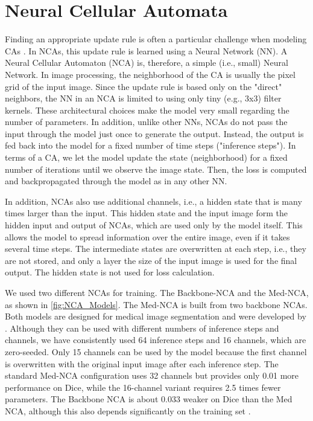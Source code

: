 \section{Neural Cellular Automata}
\label{methods:NCA}
Finding an appropriate update rule is often a particular challenge when modeling CAs \cite{Gilpin:2019:IntroduceNCA}. In NCAs, this update rule is learned using a Neural Network (NN). A Neural Cellular Automaton (NCA) is, therefore, a simple (i.e., small) Neural Network. In image processing, the neighborhood of the CA is usually the pixel grid of the input image. Since the update rule is based only on the "direct" neighbors, the NN in an NCA is limited to using only tiny (e.g., 3x3) filter kernels. These architectural choices make the model very small regarding the number of parameters. In addition, unlike other NNs, NCAs do not pass the input through the model just once to generate the output. Instead, the output is fed back into the model for a fixed number of time steps ("inference steps"). In terms of a CA, we let the model update the state (neighborhood) for a fixed number of iterations until we observe the image state. Then, the loss is computed and backpropagated through the model as in any other NN. 

In addition, NCAs also use additional channels, i.e., a hidden state that is many times larger than the input. This hidden state and the input image form the hidden input and output of NCAs, which are used only by the model itself. This allows the model to spread information over the entire image, even if it takes several time steps. The intermediate states are overwritten at each step, i.e., they are not stored, and only a layer the size of the input image is used for the final output. The hidden state is not used for loss calculation.


\label{methods:NCA:Models}
We used two different NCAs for training. The Backbone-NCA and the Med-NCA, as shown in \autoref{fig:NCA_Models}. The Med-NCA is built from two backbone NCAs. Both models are designed for medical image segmentation and were developed by \cite{kalkhof:2023:medNCA}. Although they can be used with different numbers of inference steps and channels, we have consistently used 64 inference steps and 16 channels, which are zero-seeded. Only 15 channels can be used by the model because the first channel is overwritten with the original input image after each inference step. The standard Med-NCA configuration uses 32 channels but provides only 0.01 more performance on Dice, while the 16-channel variant requires 2.5 times fewer parameters. The Backbone NCA is about 0.033 weaker on Dice than the Med NCA, although this also depends significantly on the training set \cite{kalkhof:2023:medNCA}.


